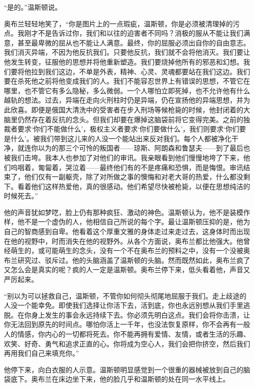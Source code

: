 ``是的。''温斯顿说。

奥布兰轻轻地笑了，``你是图片上的一点瑕疵，温斯顿，你是必须被清理掉的污点。我刚才不是告诉过你，我们和以往的迫害者不同吗？消极的服从不能让我们满意，甚至最卑微的屈从也不能让人满意。最终，你的屈服必须出自你的自由意志。我们消灭异端，不因为他反抗我们。只要他反抗，我们就不会将他消灭。我们要让他发生转变，征服他的思想并将他重新塑造。我们要烧掉他所有的邪恶和幻想。我们要将他拉到我们这边，不单是外表，精神、心灵、灵魂都要站在我们这边。我们要在杀死他之前将他变成我们的人。我们不能容忍世界上有错误的思想，不管它在哪里，也不管它有多么隐秘，多么微弱。一个人哪怕立即死掉，也不允许他有什么越轨的想法。过去，异端在走向火刑柱时仍是异端，仍在宣扬他的异端思想，并为此欣喜。即便是俄国大清洗中的受害者在步入刑场等候枪毙的时候，他封闭着的大脑里仍然存在着反抗的念头。但我们却要在爆掉这脑袋前将它变得完美。之前的独裁者要求`你们不能做什么'，极权主义者要求`你们要做什么'，我们则要求`你们要是什么'。被我们带到这儿来的人没一个能站出来反对我们。每个人都被净化干净，就连你以为的那三个可怜的叛国者——琼斯、阿朗森和鲁瑟夫——到了最后也被我们击垮。我本人也参加了对他们的审讯。我亲眼看到他们慢慢地垮了下来，他们呜咽着，匍匐着，哭泣着——最终他们有的不是疼痛和恐惧，而是悔恨。审讯结束了，他们仅有一副躯壳，除了对所做之事的懊悔和对老大哥的热爱，什么都没剩下。看着他们这样热爱他，真的很感动。他们希望尽快被枪毙，以便在思想纯洁的时候死去。''

他的声音犹如梦呓，脸上仍有那种疯狂、激动的神色。温斯顿认为，他不是装模作样，他不是一个虚伪的人，他相信自己所说的每个字。最让温斯顿压抑的是，他为自己的智商感到自卑。他看着这个厚重文雅的身体走过来走过去，这身体时而出现在他的视野中，时而消失在他的视野外。从各个方面说，奥布兰都比他强大。他曾经萌生的，或可能萌生的念头，没有一个不在奥布兰的预料之中，没有一个没被奥布兰研究过、驳斥过。他的头脑涵盖了温斯顿的头脑。然而既然如此，奥布兰疯了又怎么会是真实的呢？疯的人一定是温斯顿。奥布兰停下来，低头看着他，声音又严厉起来。

``别以为可以拯救自己，温斯顿，不管你如何彻头彻尾地屈服于我们。走上歧途的人没一个能幸免。即使我们选择让你活下去，活到底，你也永远别想从我们手里逃脱。在你身上发生的事会永远持续下去。你必须先明白这点。我们会将你击溃，让你无法回到原先的时间点。哪怕你活上一千年，也没法恢复原样，你不会再有一般人的情感，你内心的一切都将死去。你不能再拥有爱情、友情，或者生活的乐趣、欢笑、好奇、勇气和追求正直的心。你将成为空心人，我们会把你挤空，然后我们再用我们自己来填充你。''

他停下来，向白衣服的人示意。温斯顿明显感觉到一个很重的器械被放到自己的脑袋底下。奥布兰在床边坐下来，他的脸几乎和温斯顿的处在同一水平线上。

